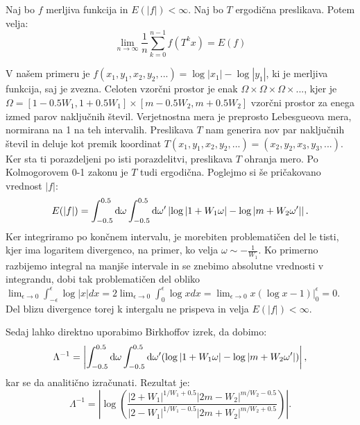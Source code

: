\begin{theorem*}
Naj bo $f$ merljiva funkcija in $E(|f|) < \infty$. Naj bo $T$ ergodična preslikava. Potem velja:
\begin{equation}
\lim_{n \to \infty} \frac{1}{n} \sum_{k=0}^{n-1} f(T^k x) = E(f)
\end{equation}
\end{theorem*}
V našem primeru je $f(x_1,y_1, x_2, y_2, ...) = \log |x_1| - \log |y_1|$, ki je merljiva funkcija, saj je zvezna. Celoten vzorčni prostor je enak $\Omega\times \Omega \times \Omega\times ...$, kjer je $\Omega = [1-0.5 W_1, 1 + 0.5 W_1] \times [m-0.5 W_2, m+0.5 W_2]$ vzorčni prostor za enega izmed parov naključnih števil. Verjetnostna mera je preprosto Lebesgueova mera, normirana na 1 na teh intervalih. Preslikava $T$ nam generira nov par naključnih števil in deluje kot premik koordinat $T (x_1,y_1,x_2,y_2,...) = (x_2,y_2,x_3,y_3,...)$. Ker sta ti porazdeljeni po isti porazdelitvi, preslikava $T$ ohranja mero. Po Kolmogorovem 0-1 zakonu \cite{diffusion} je $T$ tudi ergodična.
Poglejmo si še pričakovano vrednost $|f|$:
\begin{equation}
E(|f|) = \int_{-0.5}^{0.5} \textup{d} \omega \int_{-0.5}^{0.5} \textup{d} \omega^\prime \left| \log | 1 + W_1 \omega | - \log | m + W_2 \omega^\prime | \right|.
\end{equation}
Ker integriramo po končnem intervalu, je morebiten problematičen del le tisti, kjer ima logaritem divergenco, na primer, ko velja $\omega \sim -\frac{1}{W_1}$. Ko primerno razbijemo integral na manjše intervale in se znebimo absolutne vrednosti v integrandu, dobi tak problematičen del obliko $\lim_{\epsilon \to 0} \int_{- \epsilon}^\epsilon \log |x| dx =  2 \lim_{\epsilon \to 0} \int_{0}^\epsilon \log x dx = \lim_{\epsilon \to 0} x (\log x - 1) \rvert_0^\epsilon = 0$. Del blizu divergence torej k intergalu ne prispeva in velja $E(|f|) < \infty$.

Sedaj lahko direktno uporabimo Birkhoffov izrek, da dobimo:
\begin{equation}
\Lambda^{-1} = \left| \int_{-0.5}^{0.5} \textup{d} \omega \int_{-0.5}^{0.5} \textup{d} \omega^\prime ( \log | 1 + W_1 \omega | - \log | m + W_2 \omega^\prime | ) \right|,
\end{equation}
kar se da analitično izračunati. Rezultat je:
\begin{equation} \label{analiticnalok}
\Lambda^{-1} = \left| \log( \frac{|2+W_1|^{1/W_1 + 0.5} |2m - W_2|^{m/W_2 -0.5}}{|2-W_1|^{1/W_1-0.5} |2m + W_2|^{m/W_2 + 0.5}})\right|.
\end{equation}

